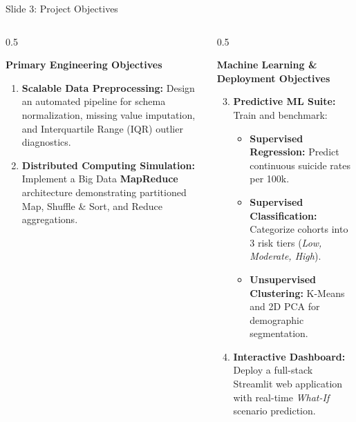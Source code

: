 \documentclass[10pt, aspectratio=169]{beamer}
\begin{document}
\begin{frame}{Slide 3: Project Objectives}
    \begin{columns}[T]
        \begin{column}{0.5\textwidth}
            \begin{block}{\textbf{Primary Engineering Objectives}}
                \begin{enumerate}
                    \item \textbf{Scalable Data Preprocessing:} Design an automated pipeline for schema normalization, missing value imputation, and Interquartile Range (IQR) outlier diagnostics.
                    \item \textbf{Distributed Computing Simulation:} Implement a Big Data \textbf{MapReduce} architecture demonstrating partitioned Map, Shuffle \& Sort, and Reduce aggregations.
                \end{enumerate}
            \end{block}
        \end{column}
        \begin{column}{0.5\textwidth}
            \begin{block}{\textbf{Machine Learning \& Deployment Objectives}}
                \begin{enumerate}
                    \setcounter{enumi}{2}
                    \item \textbf{Predictive ML Suite:} Train and benchmark:
                    \begin{itemize}
                        \item \textbf{Supervised Regression:} Predict continuous suicide rates per 100k.
                        \item \textbf{Supervised Classification:} Categorize cohorts into 3 risk tiers (\textit{Low, Moderate, High}).
                        \item \textbf{Unsupervised Clustering:} K-Means and 2D PCA for demographic segmentation.
                    \end{itemize}
                    \item \textbf{Interactive Dashboard:} Deploy a full-stack Streamlit web application with real-time \textit{What-If} scenario prediction.
                \end{enumerate}
            \end{block}
        \end{column}
    \end{columns}
\end{frame}
\end{document}
